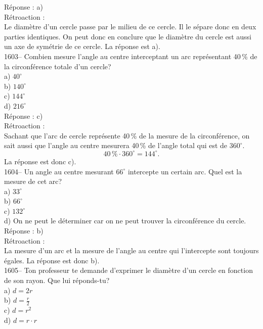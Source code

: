 R\'eponse : a)\\

R\'etroaction :\\
Le diam\`etre d'un cercle passe par le milieu de ce cercle. Il le s\'epare
donc en deux parties identiques. On peut donc en conclure que le diam\`etre
du cercle est aussi un axe de sym\'etrie de ce cercle. La r\'eponse est
a).\\

1603-- Combien mesure l'angle au centre interceptant un arc
repr\'esentant 40\,\% de la circonf\'erence totale d'un cercle?\\
a) $40^{\circ}$\\
b) $140^{\circ}$\\
c) $144^{\circ}$\\
d) $216^{\circ}$\\

R\'eponse : c)\\

R\'etroaction :\\
Sachant que l'arc de cercle repr\'esente 40\,\% de la mesure de la
circonf\'erence, on sait aussi que l'angle au centre mesurera 40\,\%
de l'angle total qui est de $360^{\circ}$. $$40\,\% \cdot
360^{\circ}=144^{\circ}.$$ La r\'eponse est donc c).\\

1604-- Un angle au centre mesurant $66^{\circ}$ intercepte un certain
arc. Quel est la mesure de cet arc?\\
a) $33^{\circ}$\\
b) $66^{\circ}$\\
c) $132^{\circ}$\\
d) On ne peut le d\'eterminer car on ne peut trouver la
circonf\'erence du cercle.\\

R\'eponse : b)\\

R\'etroaction :\\
La mesure d'un arc et la mesure de l'angle au centre qui
l'intercepte sont toujours \'egales. La r\'eponse est donc b).\\

1605-- Ton professeur te demande d'exprimer le diam\`etre d'un cercle
en fonction de son rayon. Que lui r\'eponds-tu?\\
a) $d=2r$\\
b) $d=\frac{r}{2}$\\[3mm]
c) $d=r^2$\\
d) $d=r\cdot r$\\

